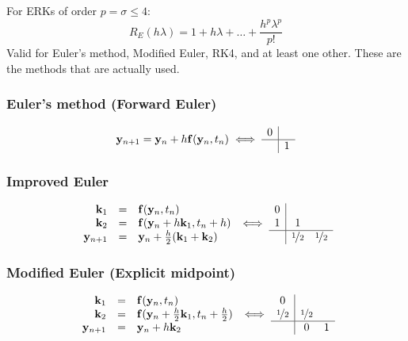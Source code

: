\documentclass[a4paper, 12pt]{article}
\begin{document}
For ERKs of order \( p = \sigma \leq 4 \):
\begin{equation}
	R_E(h \lambda) = 1 + h \lambda + \dots + \frac{h^p \lambda^p}{p!}
\end{equation}
Valid for Euler's method, Modified Euler, RK4, and at least one other. These are the methods that are actually used.

\subsubsection{Euler's method (Forward Euler)}
\begin{equation}
	\mathbf{y}_{n+1} = \mathbf{y}_n + h\mathbf{f}(\mathbf{y}_n, t_n)
	\iff
	\begin{array}{c|c}
		0 &   \\ \hline
		  & 1 \\
	\end{array}
\end{equation}

\subsubsection{Improved Euler}
\begin{equation}
	\begin{array}{rcl}
		\mathbf{k}_1  &=& \mathbf{f}(\mathbf{y}_n, t_n) \\
		\mathbf{k}_2  &=& \mathbf{f}(\mathbf{y}_n + h \mathbf{k}_1, t_n + h) \\
		\mathbf{y}_{n+1} &=& \mathbf{y}_n + \frac{h}{2}(\mathbf{k}_1 + \mathbf{k}_2) \\
	\end{array}
	\iff
	\begin{array}{c|cc}
		0 &       &       \\
		1 & 1     &       \\ \hline
		  & \nicefrac{1}{2} & \nicefrac{1}{2} \\
	\end{array}
\end{equation}

\subsubsection{Modified Euler (Explicit midpoint)}
\begin{equation}
	\begin{array}{rcl}
		\mathbf{k}_1  &=& \mathbf{f}(\mathbf{y}_n, t_n) \\
		\mathbf{k}_2  &=& \mathbf{f}(\mathbf{y}_n + \frac{h}{2}\mathbf{k}_1, t_n + \frac{h}{2}) \\
		\mathbf{y}_{n+1} &=& \mathbf{y}_n + h\mathbf{k}_2 \\
	\end{array}
	\iff
	\begin{array}{c|cc}
		0     &       &   \\
		\nicefrac{1}{2} & \nicefrac{1}{2} &   \\ \hline
		      & 0     & 1 \\
	\end{array}
\end{equation}
\end{document}
